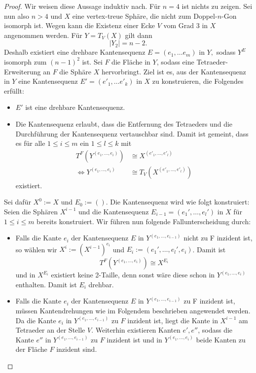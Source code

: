 \documentclass[12pt,titlepage,twoside,cleardoublepage]{article}
\theoremstyle{nummermitklammern}
\numberwithin{equation}{section}
\begin{document}
\begin{proof}
Wir weisen diese Aussage induktiv nach. Für $n=4$ ist nichts zu zeigen. Sei nun also $n>4$ und $X$ eine vertex-treue Sphäre, die nicht zum Doppel-$n$-Gon isomorph ist. 
Wegen  kann die Existenz einer Ecke $V$ vom Grad 3 in $X$ angenommen werden. Für $Y=T_V(X)$ gilt dann 
\[
\vert Y_2\vert=n-2.
\]
Deshalb existiert eine drehbare Kantensequenz $E=(e_1,\ldots e_m)$ in $Y,$ sodass $Y^E$ isomorph zum $(n-1)^2$ ist. Sei $F$ die Fläche in $Y$, sodass eine Tetraeder-Erweiterung an $F$ die Sphäre $X$ hervorbringt. Ziel ist es, aus der Kantensequenz in $Y$ eine Kantensequenz $E'=(e'_1,\ldots e'_k)$ in $X$ zu konstruieren, die Folgendes erfüllt:
\begin{itemize}
\item $E'$ ist eine drehbare Kantensequenz.
\item Die Kantensequenz erlaubt, dass die Entfernung des Tetraeders und die Durchführung der Kantensequenz vertauschbar sind. Damit ist gemeint, dass es für alle $1\leq i\leq m$ ein $1\leq l \leq k$ mit 
\begin{align*}
T^F(Y^{(e_1,\ldots, e_i)})&\cong X^{(e'_1,\ldots,e'_l)} \\
\Leftrightarrow Y^{(e_1,\ldots, e_i)}&\cong T_V(X^{(e'_1,\ldots,e'_l)})
\end{align*} 
existiert.
\end{itemize}
Sei dafür $X^0:=X$ und $E_0:=().$ Die Kantensequenz wird wie folgt konstruiert: Seien die Sphären $X^{i-1}$ und die Kantensequenz $E_{i-1}=(e_1',\ldots,e_l')$ in $X$ für $1\leq i \leq m$ bereits konstruiert. Wir führen nun folgende Fallunterscheidung durch:
\begin{itemize}
\item Falls die Kante $e_{i}$ der Kantensequenz $E$ in $Y^{(e_1,\ldots,e_{i-1})}$ nicht zu F inzident ist, so wählen wir $X^{i}:={(X^{i-1})}^{e_i}$ und $E_{i}:=(e_1',\ldots,e_l',e_i)$. Damit ist 
\[
T^F(Y^{(e_1,\ldots,e_i)})\cong X^{E_{i}}
\]
und in $X^{E_{i}}$ existiert keine 2-Taille, denn sonst wäre diese schon in $Y^{(e_1,\ldots,e_i)}$ enthalten. Damit ist $E_{i}$ drehbar.
\item Falls die Kante $e_i$ der Kantensequenz $E$ in $Y^{(e_1,\ldots,e_{i-1})}$ zu F inzident ist, müssen Kantendrehungen wie im Folgendem beschrieben angewendet werden. Da die Kante $e_i$ in $Y^{(e_1,\ldots,e_{i-1})}$ zu $F$ inzident ist, liegt die Kante in $X^{i-1}$ am Tetraeder an der Stelle $V.$
Weiterhin existieren Kanten $e',e''$, sodass die Kante $e''$ in $Y^{(e_1,\ldots,e_{i-1})}$ zu $F$ inzident ist und in $Y^{(e_1,\ldots,e_{i})}$ beide Kanten zu der Fläche $F$ inzident sind.

\end{itemize}
\end{proof}
\end{document}
